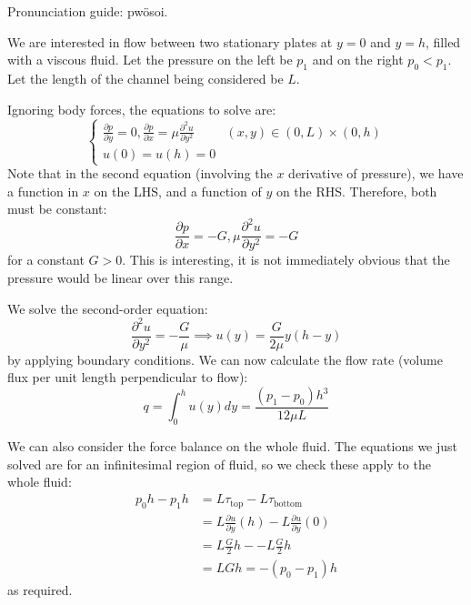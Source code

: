 \documentclass[../Main.tex]{subfiles}
\begin{document}
\begin{example}
    Pronunciation guide: pw\"osoi.

    We are interested in flow between two stationary plates at $y = 0$ and $y = h$, filled with a viscous fluid. Let the pressure on the left be $p_1$ and on the right $p_0 < p_1$. Let the length of the channel being considered be $L$.

    Ignoring body forces, the equations to solve are:
    \begin{equation*}
        \begin{cases}
            \frac{\partial p}{\partial y} = 0, \frac{\partial p}{\partial x} = \mu \frac{\partial^{2}u}{\partial y^{2}} & (x, y) \in (0, L) \times (0, h) \\
            u(0) = u(h) = 0 &
        \end{cases}
    \end{equation*}
    Note that in the second equation (involving the $x$ derivative of pressure), we have a function in $x$ on the LHS, and a function of $y$ on the RHS. Therefore, both must be constant:
    \begin{equation*}
        \frac{\partial p}{\partial x} = -G, \mu \frac{\partial^{2}u}{\partial y^{2}} = -G
    \end{equation*}
    for a constant $G > 0$. This is interesting, it is not immediately obvious that the pressure would be linear over this range.
    
    We solve the second-order equation:
    \begin{equation*}
        \frac{\partial^{2}u}{\partial y^{2}} = -\frac{G}{\mu} \implies u(y) = \frac{G}{2\mu} y(h-y)
    \end{equation*}
    by applying boundary conditions. We can now calculate the flow rate (volume flux per unit length perpendicular to flow):
    \begin{equation*}
        q = \int_{0}^{h} u(y) dy = \frac{(p_1 - p_0)h^3}{12\mu L}
    \end{equation*}

    We can also consider the force balance on the whole fluid. The equations we just solved are for an infinitesimal region of fluid, so we check these apply to the whole fluid:
    \begin{align*}
        p_0 h - p_1 h &= L\tau_{\text{top}} - L\tau_{\text{bottom}} \\
        &= L \frac{\partial u}{\partial y}(h) - L \frac{\partial u}{\partial y}(0) \\
        &= L\frac{G}{2}h - -L\frac{G}{2}h \\
        &= LGh = -(p_0 - p_1)h
    \end{align*}
    as required.
\end{example}
\end{document}
